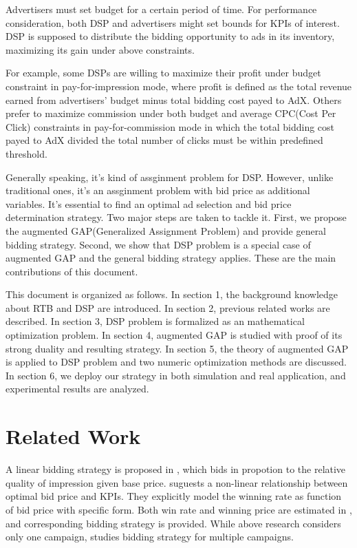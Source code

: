 \documentclass{article}
\theoremstyle{definition}
\begin{document}
\begin{CJK}{UTF8}{gbsn}
Advertisers must set budget for a certain period of time.
For performance consideration, both DSP and advertisers might set bounds for KPIs of interest.
DSP is supposed to distribute the bidding opportunity to ads in its inventory, maximizing its gain under above constraints.

For example, some DSPs are willing to maximize their profit under budget constraint in pay-for-impression mode,
    where profit is defined as the total revenue earned from advertisers' budget minus total bidding cost payed to AdX.
Others prefer to maximize commission under both budget and average CPC(Cost Per Click) constraints in pay-for-commission mode
    in which the total bidding cost payed to AdX divided the total number of clicks must be within predefined threshold.

Generally speaking, it's kind of assginment problem for DSP.
However, unlike traditional ones, it's an assginment problem with bid price as additional variables.
It's essential to find an optimal ad selection and bid price determination strategy.
Two major steps are taken to tackle it.
First, we propose the augmented GAP(Generalized Assignment Problem) and provide general bidding strategy.
Second, we show that DSP problem is a special case of augmented GAP and the general bidding strategy applies.
These are the main contributions of this document.

This document is organized as follows.
In section 1, the background knowledge about RTB and DSP are introduced.
In section 2, previous related works are described.
In section 3, DSP problem is formalized as an mathematical optimization problem.
In section 4, augmented GAP is studied with proof of its strong duality and resulting strategy.
In section 5, the theory of augmented GAP is applied to DSP problem and two numeric optimization methods are discussed.
In section 6, we deploy our strategy in both simulation and real application, and experimental results are analyzed.

\newpage
\section{Related Work}

A linear bidding strategy is proposed in \cite{M6D}, which bids in propotion to the relative quality of impression given base price.
\cite{WeinanZhang2014} suguests a non-linear relationship between optimal bid price and KPIs.
They explicitly model the winning rate as function of bid price with specific form.
Both win rate and winning price are estimated in \cite{XiangLi2014}, and corresponding bidding strategy is provided.
While above research considers only one campaign, \cite{WeinanZhang2015} studies bidding strategy for multiple campaigns.


\end{CJK}
\end{document}
